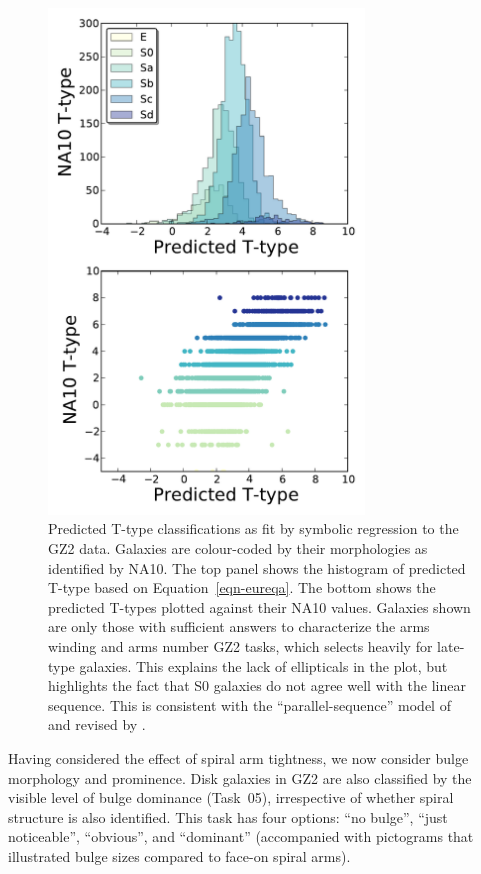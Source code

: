 \documentclass[useAMS,usenatbib]{mn2e}
\begin{document}
\begin{figure}
\includegraphics[angle=0,width=3.3in]{figures/eureqa.pdf}
\caption{Predicted T-type classifications as fit by symbolic regression to the GZ2 data. Galaxies are colour-coded by their morphologies as identified by NA10. The top panel shows the histogram of predicted T-type based on Equation~\ref{eqn-eureqa}. The bottom shows the predicted T-types plotted against their NA10 values. Galaxies shown are only those with sufficient answers to characterize the arms winding and arms number GZ2 tasks, which selects heavily for late-type galaxies. This explains the lack of ellipticals in the plot, but highlights the fact that S0 galaxies do not agree well with the linear sequence. This is consistent with the ``parallel-sequence'' model of \citet{van76} and revised by \citet{kor12}. 
\label{fig-eureqa}}
\end{figure}

Having considered the effect of spiral arm tightness, we now consider bulge morphology and prominence. Disk galaxies in GZ2 are also classified by the visible level of bulge dominance (Task~05), irrespective of whether spiral structure is also identified. This task has four options: ``no bulge'', ``just noticeable'', ``obvious'', and ``dominant'' (accompanied with pictograms that illustrated bulge sizes compared to face-on spiral arms). 
\end{document}
